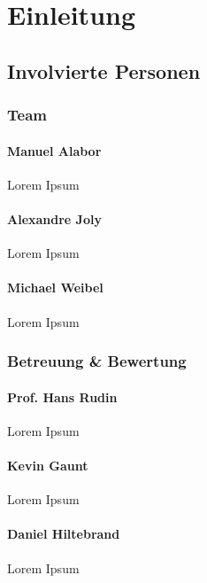 \chapter{Einleitung}
\lipsum[1]

\section{Involvierte Personen}
\subsection{Team}
\subsubsection*{Manuel Alabor}
Lorem Ipsum

\subsubsection*{Alexandre Joly}
Lorem Ipsum

\subsubsection*{Michael Weibel}
Lorem Ipsum


\subsection{Betreuung \& Bewertung}
\subsubsection*{Prof. Hans Rudin}
Lorem Ipsum

\subsubsection*{Kevin Gaunt}
Lorem Ipsum

\subsubsection*{Daniel Hiltebrand}
Lorem Ipsum
